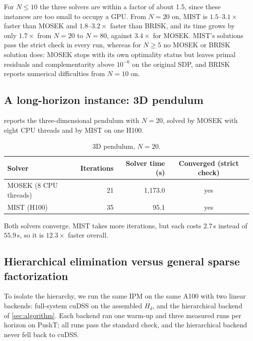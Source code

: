 For $N\le10$ the three solvers are within a factor of about 1.5, since these
instances are too small to occupy a GPU. From $N=20$ on, MIST is $1.5$--$3.1\times$
faster than MOSEK and $1.8$--$3.2\times$ faster than BRISK, and its time grows by
only $1.7\times$ from $N=20$ to $N=80$, against $3.4\times$ for MOSEK. MIST's
solutions pass the strict check in every run, whereas for $N\ge5$ no MOSEK or
BRISK solution does: MOSEK stops with its own optimality status but leaves primal
residuals and complementarity above $10^{-6}$ on the original SDP, and BRISK
reports numerical difficulties from $N=10$ on.

\subsection{A long-horizon instance: 3D pendulum}\label{sec:pendulum}

 reports the three-dimensional pendulum with $N=20$, solved by
MOSEK with eight CPU threads and by MIST on one H100.

\begin{table}[htbp]
\centering
\caption{3D pendulum, $N=20$.}
\label{tab:pendulum}
\small
\begin{tabular}{@{}lrrc@{}}
\toprule
Solver & Iterations & Solver time (s) & Converged (strict check)\\
\midrule
MOSEK (8 CPU threads) & 21 & 1{,}173.0 & yes\\
MIST (H100) & 35 & 95.1 & yes\\
\bottomrule
\end{tabular}
\end{table}

Both solvers converge. MIST takes more iterations, but each costs $2.7$\,s instead of $55.9$\,s, so it is $12.3\times$ faster overall.

\subsection{Hierarchical elimination versus general sparse factorization}\label{sec:cudss}

To isolate the hierarchy, we run the same IPM on the same A100 with two linear
backends: full-system cuDSS on the assembled $H_\delta$, and the hierarchical
backend of \cref{sec:algorithm}. Each backend ran one warm-up and three measured
runs per horizon on PushT; all runs pass the standard check, and the hierarchical
backend never fell back to cuDSS.

